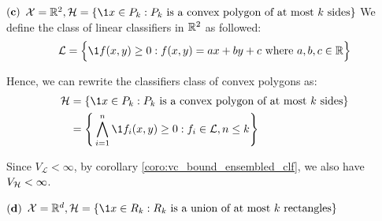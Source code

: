 \begin{solution*}
\begin{subproof}{\newline ${\bf (c)}$ $\X=\R^2, \Hf=\{ \1{x \in P_k} : P_k \text{ is a convex polygon of at most $k$ sides} \}$}
        \noindent We define the class of linear classifiers in $\mathbb{R}^2$ as followed:
        \begin{align*}
            \mathcal{L} = \bigCurl{
                \1{f(x, y) \ge 0} : f(x, y) = ax + by + c \text{ where } a, b, c \in \R
            }
        \end{align*}

        \noindent Hence, we can rewrite the classifiers class of convex polygons as:
        \begin{align*}
            \Hf
                &=\{ \1{x \in P_k} : P_k \text{ is a convex polygon of at most $k$ sides} \} \\
                &= \biggCurl{
                    \bigwedge_{i=1}^n \1{f_i(x, y) \ge 0} : f_i \in \mathcal{L}, n \le k
                }
        \end{align*}

        \noindent Since $V_\mathcal{L}<\infty$, by corollary \ref{coro:vc_bound_ensembled_clf}, we also have $V_{\mathcal{H}}<\infty$.
    \end{subproof}

    \begin{subproof}{\newline ${\bf (d)}$ $\X=\R^d, \Hf=\{ \1{x \in R_k} : R_k \text{ is a union of at most $k$ rectangles} \}$}
        
    \end{subproof}
\end{solution*}


